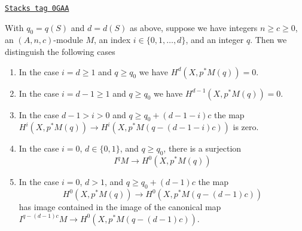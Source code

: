 \begin{lemma}
\label{local-cohomology-lemma-vanishing-coh-almost-projective}
\href{https://stacks.math.columbia.edu/tag/0GAA}{\texttt{Stacks tag 0GAA}}

With $q_0 = q(S)$ and $d = d(S)$ as above, suppose we have
integers $n \geq c \geq 0$, an $(A, n, c)$-module $M$,
an index $i \in \{0, 1, \ldots, d\}$, and an integer $q$.
Then we distinguish the following cases
\begin{enumerate}
\item In the case $i = d \geq 1$ and $q \geq q_0$ we have
$H^d(X, p^*M(q)) = 0$.
\item In the case $i = d - 1 \geq 1$ and $q \geq q_0$ we have
$H^{d - 1}(X, p^*M(q)) = 0$.
\item In the case $d - 1 > i > 0$ and $q \geq q_0 + (d - 1 - i)c$
the map
$H^i(X, p^*M(q)) \to H^i(X, p^*M(q - (d - 1 - i)c))$
is zero.
\item In the case $i = 0$, $d \in \{0, 1\}$, and $q \geq q_0$, there
is a surjection
$$
I^qM \longrightarrow H^0(X, p^*M(q))
$$
\item In the case $i = 0$, $d > 1$, and $q \geq q_0 + (d - 1)c$ the map
$$
H^0(X, p^*M(q)) \to H^0(X, p^*M(q - (d - 1)c))
$$
has image contained in the image of the canonical map
$I^{q - (d - 1)c}M \to H^0(X, p^*M(q - (d - 1)c))$.
\end{enumerate}
\end{lemma}

